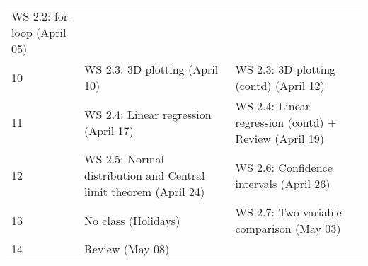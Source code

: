 \documentclass[
]{article}
\begin{document}
\begin{longtable}[]{@{}lll@{}}
\begin{minipage}[t]{0.36\columnwidth}
WS 2.2: for-loop (April 05)\strut
\end{minipage}\tabularnewline
\begin{minipage}[t]{0.18\columnwidth}\raggedright
10\strut
\end{minipage} & \begin{minipage}[t]{0.38\columnwidth}\raggedright
WS 2.3: 3D plotting (April 10)\strut
\end{minipage} & \begin{minipage}[t]{0.36\columnwidth}\raggedright
WS 2.3: 3D plotting (contd) (April 12)\strut
\end{minipage}\tabularnewline
\begin{minipage}[t]{0.18\columnwidth}\raggedright
11\strut
\end{minipage} & \begin{minipage}[t]{0.38\columnwidth}\raggedright
WS 2.4: Linear regression (April 17)\strut
\end{minipage} & \begin{minipage}[t]{0.36\columnwidth}\raggedright
WS 2.4: Linear regression (contd) + Review (April 19)\strut
\end{minipage}\tabularnewline
\begin{minipage}[t]{0.18\columnwidth}\raggedright
12\strut
\end{minipage} & \begin{minipage}[t]{0.38\columnwidth}\raggedright
WS 2.5: Normal distribution and Central limit theorem (April 24)\strut
\end{minipage} & \begin{minipage}[t]{0.36\columnwidth}\raggedright
WS 2.6: Confidence intervals (April 26)\strut
\end{minipage}\tabularnewline
\begin{minipage}[t]{0.18\columnwidth}\raggedright
13\strut
\end{minipage} & \begin{minipage}[t]{0.38\columnwidth}\raggedright
No class (Holidays)\strut
\end{minipage} & \begin{minipage}[t]{0.36\columnwidth}\raggedright
WS 2.7: Two variable comparison (May 03)\strut
\end{minipage}\tabularnewline
\begin{minipage}[t]{0.18\columnwidth}\raggedright
14\strut
\end{minipage} & \begin{minipage}[t]{0.38\columnwidth}\raggedright
Review (May 08)\strut
\end{minipage} & \begin{minipage}[t]{0.36\columnwidth}\raggedright

\end{minipage}
\end{longtable}
\end{document}
